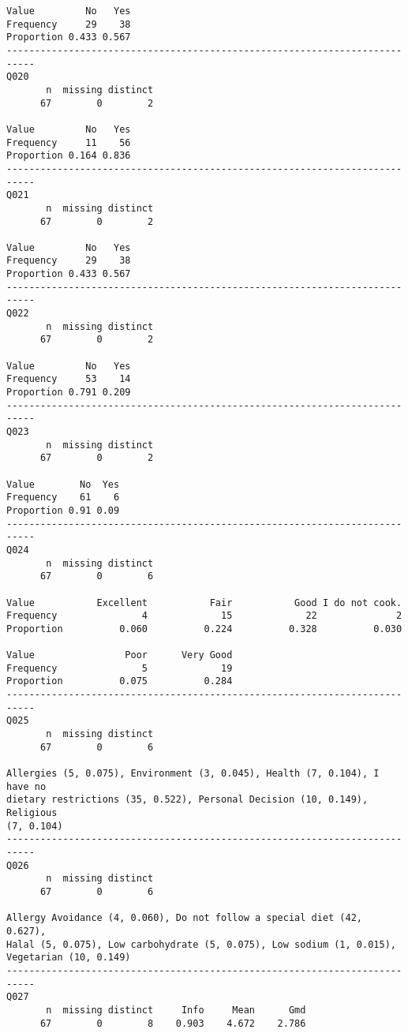 \documentclass[]{article}
\begin{document}
\begin{verbatim}
Value         No   Yes
Frequency     29    38
Proportion 0.433 0.567
---------------------------------------------------------------------------
Q020 
       n  missing distinct 
      67        0        2 
                      
Value         No   Yes
Frequency     11    56
Proportion 0.164 0.836
---------------------------------------------------------------------------
Q021 
       n  missing distinct 
      67        0        2 
                      
Value         No   Yes
Frequency     29    38
Proportion 0.433 0.567
---------------------------------------------------------------------------
Q022 
       n  missing distinct 
      67        0        2 
                      
Value         No   Yes
Frequency     53    14
Proportion 0.791 0.209
---------------------------------------------------------------------------
Q023 
       n  missing distinct 
      67        0        2 
                    
Value        No  Yes
Frequency    61    6
Proportion 0.91 0.09
---------------------------------------------------------------------------
Q024 
       n  missing distinct 
      67        0        6 
                                                                      
Value           Excellent           Fair           Good I do not cook.
Frequency               4             15             22              2
Proportion          0.060          0.224          0.328          0.030
                                        
Value                Poor      Very Good
Frequency               5             19
Proportion          0.075          0.284
---------------------------------------------------------------------------
Q025 
       n  missing distinct 
      67        0        6 

Allergies (5, 0.075), Environment (3, 0.045), Health (7, 0.104), I have no
dietary restrictions (35, 0.522), Personal Decision (10, 0.149), Religious
(7, 0.104)
---------------------------------------------------------------------------
Q026 
       n  missing distinct 
      67        0        6 

Allergy Avoidance (4, 0.060), Do not follow a special diet (42, 0.627),
Halal (5, 0.075), Low carbohydrate (5, 0.075), Low sodium (1, 0.015),
Vegetarian (10, 0.149)
---------------------------------------------------------------------------
Q027 
       n  missing distinct     Info     Mean      Gmd 
      67        0        8    0.903    4.672    2.786 
                                                          

\end{verbatim}
\end{document}
